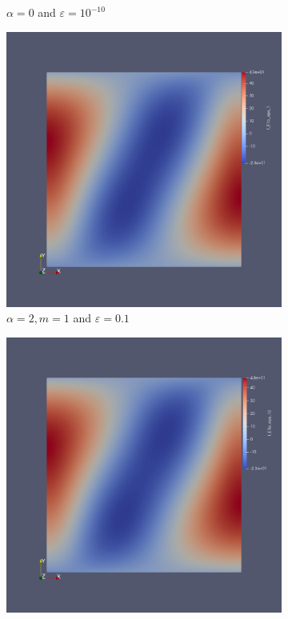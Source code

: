 \documentclass[12pt]{ociamthesis}
\begin{document}
\begin{figure}[H]
\begin{subfigure}{0.44\textwidth}
     \caption{$\alpha=0$ and $\varepsilon = 10^{-10}$}
 \end{subfigure}
 \begin{subfigure}{0.44\textwidth}
     \includegraphics[width=\textwidth]{Pics/uf/F_E1b_eps1.png}
     \caption{$\alpha=2, m=1$ and $\varepsilon = 0.1$}
 \end{subfigure}
 \begin{subfigure}{0.44\textwidth}
     \includegraphics[width=\textwidth]{Pics/uf/F_E1b_eps_10.png}

\end{subfigure}
\end{figure}
\end{document}
